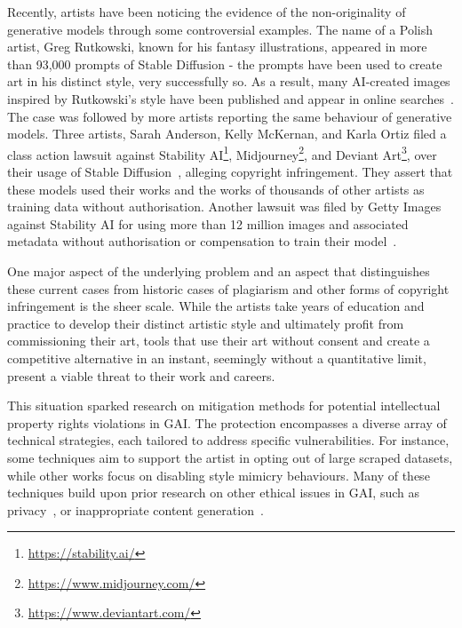 \documentclass[conference,table]{IEEEtran}
\begin{document}
Recently, artists have been noticing the evidence of the non-originality of generative models through some controversial examples. 
The name of a Polish artist, Greg Rutkowski, known for his fantasy illustrations, appeared in more than 93,000 prompts of Stable Diffusion - the prompts have been used to create art in his distinct style, very successfully so. 
As a result, many AI-created images inspired by Rutkowski's style have been published and appear in online searches~\cite{heikkila_this_2022}. The case was followed by more artists reporting the same behaviour of generative models. 
Three artists, Sarah Anderson, Kelly McKernan, and Karla Ortiz filed a class action lawsuit against Stability AI\footnote{\url{https://stability.ai/}}, Midjourney\footnote{\url{https://www.midjourney.com/}}, and Deviant Art\footnote{\url{https://www.deviantart.com/}}, over their usage of Stable Diffusion~\cite{rombach_high-resolution_2022}, alleging copyright infringement. They assert that these models used their works and the works of thousands of other artists as training data without authorisation.
Another lawsuit was filed by Getty Images against Stability AI for using more than 12 million images and associated metadata without authorisation or compensation to train their model~\cite{nolan_ai_2023}.

One major aspect of the underlying problem and an aspect that distinguishes these current cases from historic cases of plagiarism and other forms of copyright infringement is the sheer scale.
While the artists take years of education and practice to develop their distinct artistic style and ultimately profit from commissioning their art, tools that use their art without consent and create a competitive alternative in an instant, seemingly without a quantitative limit, present a viable threat to their work and careers.

This situation sparked research on mitigation methods for potential intellectual property rights violations in GAI. 
The protection encompasses a diverse array of technical strategies, each tailored to address specific vulnerabilities.
For instance, some techniques aim to support the artist in opting out of large scraped datasets, while other works focus on disabling style mimicry behaviours. 
Many of these techniques build upon prior research on other ethical issues in GAI, such as privacy~\cite{matsumoto_membership_2023}, or inappropriate content generation~\cite{gandikota_erasing_2023}.
\end{document}

